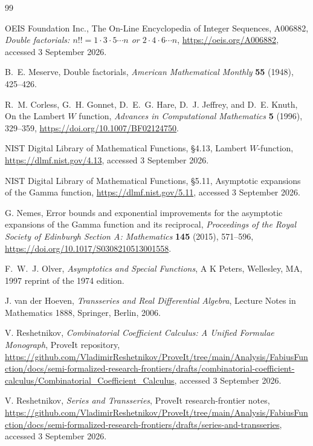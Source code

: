 \documentclass[11pt,oneside]{article}
\theoremstyle{plain}
\theoremstyle{definition}
\theoremstyle{remark}
\begin{document}
\begin{thebibliography}{99}

OEIS Foundation Inc.,
\newblock The On-Line Encyclopedia of Integer Sequences, A006882,
\newblock \emph{Double factorials: \(n!!=1\cdot3\cdot5\cdots n\) or
\(2\cdot4\cdot6\cdots n\)},
\newblock \url{https://oeis.org/A006882}, accessed 3 September 2026.

B.~E. Meserve,
\newblock Double factorials,
\newblock \emph{American Mathematical Monthly} \textbf{55} (1948), 425--426.

R.~M. Corless, G.~H. Gonnet, D.~E.~G. Hare, D.~J. Jeffrey, and D.~E. Knuth,
\newblock On the Lambert \(W\) function,
\newblock \emph{Advances in Computational Mathematics} \textbf{5} (1996),
329--359,
\newblock \url{https://doi.org/10.1007/BF02124750}.

NIST Digital Library of Mathematical Functions,
\newblock \S4.13, Lambert \(W\)-function,
\newblock \url{https://dlmf.nist.gov/4.13}, accessed 3 September 2026.

NIST Digital Library of Mathematical Functions,
\newblock \S5.11, Asymptotic expansions of the Gamma function,
\newblock \url{https://dlmf.nist.gov/5.11}, accessed 3 September 2026.

G. Nemes,
\newblock Error bounds and exponential improvements for the asymptotic
expansions of the Gamma function and its reciprocal,
\newblock \emph{Proceedings of the Royal Society of Edinburgh Section A:
Mathematics} \textbf{145} (2015), 571--596,
\newblock \url{https://doi.org/10.1017/S0308210513001558}.

F.~W.~J. Olver,
\newblock \emph{Asymptotics and Special Functions},
\newblock A K Peters, Wellesley, MA, 1997 reprint of the 1974 edition.

J. van der Hoeven,
\newblock \emph{Transseries and Real Differential Algebra},
\newblock Lecture Notes in Mathematics 1888, Springer, Berlin, 2006.

V. Reshetnikov,
\newblock \emph{Combinatorial Coefficient Calculus: A Unified Formulae
Monograph}, ProveIt repository,
\newblock \url{https://github.com/VladimirReshetnikov/ProveIt/tree/main/Analysis/FabiusFunction/docs/semi-formalized-research-frontiers/drafts/combinatorial-coefficient-calculus/Combinatorial_Coefficient_Calculus},
accessed 3 September 2026.

V. Reshetnikov,
\newblock \emph{Series and Transseries}, ProveIt research-frontier notes,
\newblock \url{https://github.com/VladimirReshetnikov/ProveIt/tree/main/Analysis/FabiusFunction/docs/semi-formalized-research-frontiers/drafts/series-and-transseries},
accessed 3 September 2026.


\end{thebibliography}
\end{document}
